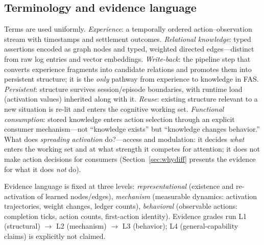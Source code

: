 \documentclass[10pt,a4paper]{article}
\begin{document}
\subsection{Terminology and evidence language}
Terms are used uniformly. \emph{Experience}: a temporally ordered action--observation stream with timestamps and settlement outcomes. \emph{Relational knowledge}: typed assertions encoded as graph nodes and typed, weighted directed edges---distinct from raw log entries and vector embeddings. \emph{Write-back}: the pipeline step that converts experience fragments into candidate relations and promotes them into persistent structure; it is the \emph{only} pathway from experience to knowledge in FAS. \emph{Persistent}: structure survives session/episode boundaries, with runtime load (activation values) inherited along with it. \emph{Reuse}: existing structure relevant to a new situation is re-lit and enters the cognitive working set. \emph{Functional consumption}: stored knowledge enters action selection through an explicit consumer mechanism---not ``knowledge exists'' but ``knowledge changes behavior.'' What does \emph{spreading activation} do?---access and modulation: it decides \emph{what} enters the working set and at what strength it competes for attention; it does not make action decisions for consumers (Section~\ref{sec:whydiff} presents the evidence for what it does \emph{not} do).

Evidence language is fixed at three levels: \emph{representational} (existence and re-activation of learned nodes/edges), \emph{mechanism} (measurable dynamics: activation trajectories, weight changes, ledger counts), \emph{behavioral} (observable actions: completion ticks, action counts, first-action identity). Evidence grades run L1 (structural) $\rightarrow$ L2 (mechanism) $\rightarrow$ L3 (behavior); L4 (general-capability claims) is explicitly not claimed.
\end{document}
